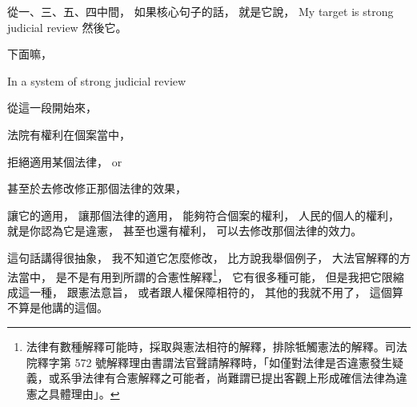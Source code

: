 \hypertarget{w06:cue:497}{}從一、三、五、四中間，
\hypertarget{w06:cue:498}{}如果核心句子的話，
\hypertarget{w06:cue:499}{}就是它說，
\hypertarget{w06:cue:500}{}My target is strong judicial review
\hypertarget{w06:cue:501}{}然後它。

\hypertarget{w06:cue:502}{}下面嘛，

\hypertarget{w06:cue:503}{}In a system of strong judicial review

\hypertarget{w06:cue:504}{}從這一段開始來，

\hypertarget{w06:cue:505}{}法院有權利在個案當中，

\hypertarget{w06:cue:506}{}拒絕適用某個法律，
\hypertarget{w06:cue:507}{}or

\hypertarget{w06:cue:508}{}甚至於去修改修正那個法律的效果，

\hypertarget{w06:cue:509}{}讓它的適用，
\hypertarget{w06:cue:510}{}讓那個法律的適用，
\hypertarget{w06:cue:511}{}能夠符合個案的權利，
\hypertarget{w06:cue:512}{}人民的個人的權利，
\hypertarget{w06:cue:513}{}就是你認為它是違憲，
\hypertarget{w06:cue:514}{}甚至也還有權利，
\hypertarget{w06:cue:515}{}可以去修改那個法律的效力。

\hypertarget{w06:cue:516}{}這句話講得很抽象，
\hypertarget{w06:cue:517}{}我不知道它怎麼修改，
\hypertarget{w06:cue:518}{}比方說我舉個例子，
\hypertarget{w06:cue:519}{}大法官解釋的方法當中，
\hypertarget{w06:cue:520}{}是不是有用到所謂的合憲性解釋\footnote{法律有數種解釋可能時，採取與憲法相符的解釋，排除牴觸憲法的解釋。司法院釋字第 572 號解釋理由書謂法官聲請解釋時，「如僅對法律是否違憲發生疑義，或系爭法律有合憲解釋之可能者，尚難謂已提出客觀上形成確信法律為違憲之具體理由」。}，
\hypertarget{w06:cue:521}{}它有很多種可能，
\hypertarget{w06:cue:522}{}但是我把它限縮成這一種，
\hypertarget{w06:cue:523}{}跟憲法意旨，
\hypertarget{w06:cue:524}{}或者跟人權保障相符的，
\hypertarget{w06:cue:525}{}其他的我就不用了，
\hypertarget{w06:cue:526}{}這個算不算是他講的這個。

